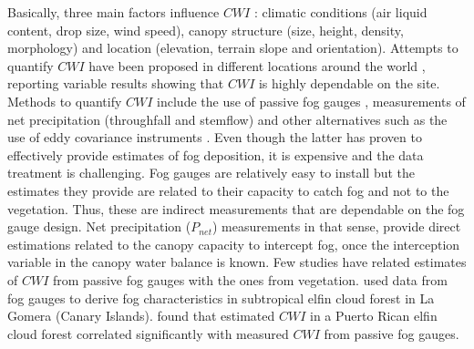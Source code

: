 \documentclass[a4paper,12pt]{article}
\begin{document}
Basically, three main factors influence $CWI$ \citep{Villegasetal2008, Ritteretal2008, Braumanetal2010}: climatic conditions (air liquid content, drop size, wind speed), canopy structure (size, height, density, morphology) and location (elevation, terrain slope and orientation). Attempts to quantify $CWI$ have been proposed in different locations around the world \citep{Ingrahametal1988, CavalierandGoldstein1989, Hamiltonetal1995, Holder2004, McJannetetal2007a, Gabrieletal2008, GomezPeraltaetal2008, Ritteretal2008, Villegasetal2008, Holwerdaetal2010, Ueharaetal2012, Pryetetal2012a}, reporting variable results showing that $CWI$ is highly dependable on the site. Methods to quantify $CWI$ include the use of passive fog gauges \citep{Juvik1978, Ingrahametal1988, Aboaletal2000, Villegasetal2008, Frumauetal2011}, measurements of net precipitation (throughfall and stemflow) \citep{Holder2003, Gabrieletal2008, Pradaetal2009, Pryetetal2012a} and other alternatives such as the use of eddy covariance instruments \citep{Changetal2002, Holwerdaetal2006, Eugsteretal2006}. Even though the latter has proven to effectively provide estimates of fog deposition, it is expensive and the data treatment is challenging. Fog gauges are relatively easy to install but the estimates they provide are related to their capacity to catch fog and not to the vegetation. Thus, these are indirect measurements that are dependable on the fog gauge design. Net precipitation ($P_{net}$) measurements in that sense, provide direct estimations related to the canopy capacity to intercept fog, once the interception variable in the canopy water balance is known. Few studies have related estimates of $CWI$ from passive fog gauges with the ones from vegetation. \cite{Ritteretal2008} used data from fog gauges to derive fog characteristics in subtropical elfin cloud forest in La Gomera (Canary Islands). \cite{Holwerdaetal2011} found that estimated $CWI$ in a Puerto Rican elfin cloud forest correlated significantly with measured $CWI$ from passive fog gauges.
\end{document}
